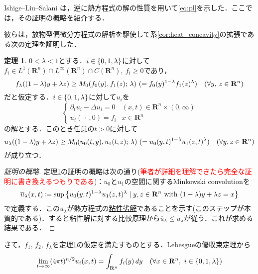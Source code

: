 \documentclass[a4j]{ltjsarticle}
\newcommand{\Rset}{\mathbf{R}}
\newcommand{\1}{\bm{1}}
\newcommand{\M}[4]{M_{#1}\qty(#2,#3;\,#4)}
\numberwithin{equation}{section}
\theoremstyle{definition}
\newtheorem{thm}{定理}[section]
\begin{document}
Ishige--Liu--Salani \cite{ILS}は，逆に熱方程式の解の性質を用いて\eqref{eq:pl}を示した．ここでは，その証明の概略を紹介する．

彼らは，放物型偏微分方程式の解析を駆使して系\ref{cor:heat_concavity}の拡張である次の定理を証明した．
\begin{thm}\label{thm:conc_preserve}
    $0<\lambda<1$とする．$i\in\qty{0,1,\lambda}$に対して$f_i\in L^1(\Rset^n)\cap L^\infty(\Rset^n)\cap C(\Rset^n),\ f_i\geq0$であり，
    \begin{equation}
        f_\lambda((1-\lambda)y+\lambda z)\geq \M{0}{f_0(y)}{f_1(z)}{\lambda}\ (=f_0(y)^{1-\lambda}f_1(z)^{\lambda})\quad (\forall y,\,z\in\Rset^n)\label{eq:conc_preserve_assump}
    \end{equation}
    だと仮定する．$i\in\qty{0,1,\lambda}$に対して$u_i$を
    \begin{equation}
        \left\{
        \begin{array}{rl}
            \partial_{t}u_i-\Delta u_i=0 & (x,t)\in\Rset^n\times (0,\infty)\\
            u_i(\,\cdot\,,0)=f_i & x\in\Rset^n
        \end{array}
        \right.
    \end{equation}
    の解とする．このとき任意の$t>0$に対して
    \begin{equation}
        u_\lambda((1-\lambda)y+\lambda z)\geq \M{0}{u_0(t,y)}{u_1(t,z)}{\lambda}\ (=u_{0}(y,t)^{1-\lambda}u_{1}(z,t)^{\lambda})\quad (\forall y,z\in\Rset^n)
    \end{equation}
    が成り立つ．
\end{thm}
\begin{proof}[\textup{証明の概略}]
    定理\ref{thm:conc_preserve}の証明の概略は次の通り(\textcolor{red}{筆者が詳細を理解できたら完全な証明に書き換えるつもりである})：$u_0$と$u_1$の空間に関するMinkowski convolutionを
    \begin{equation}
        \overline{u}_{\lambda}(x,t)\coloneqq \sup\qty{u_{0}(y,t)^{1-\lambda}u_1(z,t)^{\lambda}\mid y,z\in\Rset^n\ \text{with}\ (1-\lambda)y+\lambda z=x}
    \end{equation}
    で定義する．この$\overline{u}_{\lambda}$が熱方程式の\underline{粘性劣解}であることを示す(このステップが本質的である)．すると粘性解に対する比較原理から$\overline{u}_{\lambda}\leq u_{\lambda}$が従う．これが求める結果である．
\end{proof}
さて，$f_1,\,f_2,\,f_\lambda$を定理\ref{thm:conc_preserve}の仮定を満たすものとする．Lebesgueの優収束定理から
\begin{equation}
    \lim_{t\to\infty}(4\pi t)^{n/2}u_i(x,t)=\int_{\Rset^n}f_i(y)\,dy\quad (\forall x\in\Rset^n,\ i\in\qty{0,1,\lambda})
\end{equation}
\end{document}
